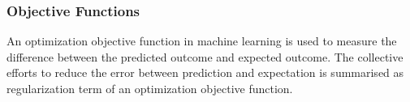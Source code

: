 \subsubsection{Objective Functions}
An optimization objective function in machine learning is used to measure the difference between the predicted outcome and expected outcome. The collective efforts to reduce the error between prediction and expectation is summarised as regularization term of an optimization objective function.  